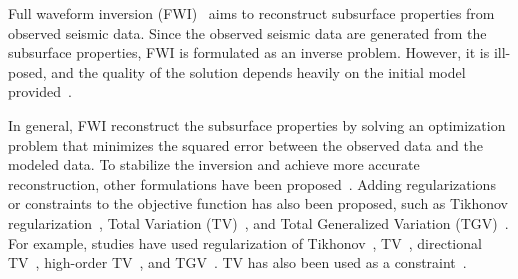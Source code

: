 %


Full waveform inversion (FWI)~\cite{FWI0,FWI1} aims to reconstruct subsurface properties from observed seismic data.
Since the observed seismic data are generated from the subsurface properties, FWI is formulated as an inverse problem.
However, it is ill-posed, and the quality of the solution depends heavily on the initial model provided~\cite{FWI1}.

In general, FWI reconstruct the subsurface properties by solving an optimization problem that minimizes the squared error between the observed data and the modeled data.
To stabilize the inversion and achieve more accurate reconstruction, other formulations have been proposed~\cite{CustomFWI0,CustomFWI1,CustomFWI2,CustomFWI3,CustomFWI4,CustomFWI5}.
Adding regularizations or constraints to the objective function has also been proposed, such as Tikhonov regularization~\cite{tikhonov}, Total Variation (TV)~\cite{TV}, and Total Generalized Variation (TGV)~\cite{TGV}.
For example, studies have used regularization of Tikhonov~\cite{FWI-with-tikhonov-regularization}, TV~\cite{FWI-with-TV-regularization}, directional TV~\cite{FWI-with-directional-TV-regularization}, high-order TV~\cite{FWI-with-high-order-TV-regularization}, and TGV~\cite{FWI-with-TGV-regularization}.
TV has also been used as a constraint~\cite{FWI-with-TV-constraint,FWI-with-TV-constraint2,FWI-with-TV-constraint3}.

